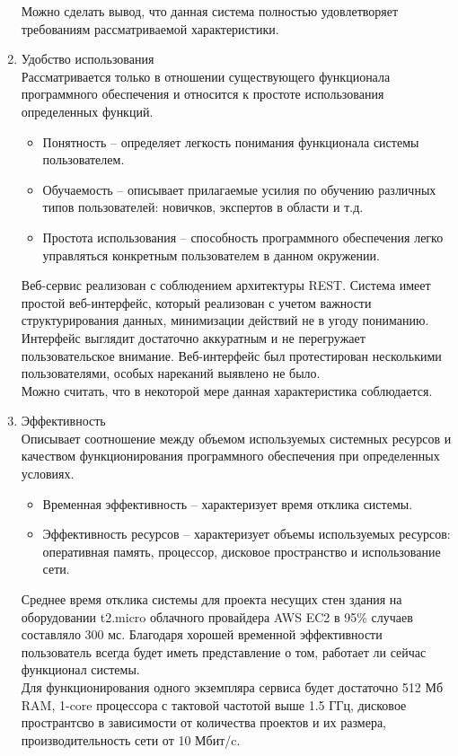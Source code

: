 \documentclass[a4paper,14pt]{extreport} %
\begin{document}
\begin{enumerate}
Можно сделать вывод, что данная система полностью удовлетворяет требованиям рассматриваемой характеристики.
\item Удобство использования \\
Рассматривается только в отношении существующего функционала программного обеспечения и относится к простоте использования определенных функций.
\begin{itemize}
\item Понятность -- определяет легкость понимания функционала системы пользователем.
\item Обучаемость -- описывает прилагаемые усилия по обучению различных типов пользователей: новичков, экспертов в области и т.д.
\item Простота использования -- способность программного обеспечения легко управляться конкретным пользователем в данном окружении.
\end{itemize}
Веб-сервис реализован с соблюдением архитектуры REST. Система имеет простой веб-интерфейс, который реализован с учетом важности структурирования данных, минимизации действий не в угоду пониманию. Интерфейс выглядит достаточно аккуратным и не перегружает пользовательское внимание. Веб-интерфейс был протестирован несколькими пользователями, особых нареканий выявлено не было. \\
Можно считать, что в некоторой мере данная характеристика соблюдается.
\item Эффективность \\
Описывает соотношение между объемом используемых системных ресурсов и качеством функционирования программного обеспечения при определенных условиях.
\begin{itemize}
\item Временная эффективность -- характеризует время отклика системы.
\item Эффективность ресурсов -- характеризует объемы используемых ресурсов: оперативная память, процессор, дисковое пространство и использование сети.
\end{itemize}
Среднее время отклика системы для проекта несущих стен здания на оборудовании t2.micro облачного провайдера AWS EC2 в 95\% случаев составляло 300 мс. Благодаря хорошей временной эффективности пользователь всегда будет иметь представление о том, работает ли сейчас функционал системы. \\
Для функционирования одного экземпляра сервиса будет достаточно 512 Мб RAM, 1-core процессора с тактовой частотой выше 1.5 ГГц, дисковое пространтсво в зависимости от количества проектов и их размера, производительность сети от 10 Мбит/c.

\end{enumerate}
\end{document}
